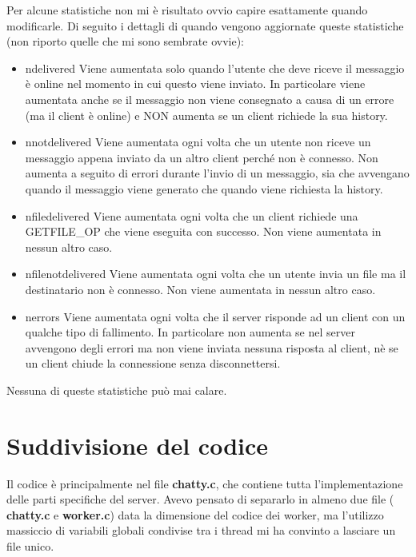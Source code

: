 \documentclass[a4paper]{article}
\theoremstyle{theorem}
\theoremstyle{remark}
\theoremstyle{definition}
\theoremstyle{corollary}
\theoremstyle{lemma}
\newcommand\file[1]{%
	\textbf{#1}}
\begin{document}
Per alcune statistiche non mi è risultato ovvio capire esattamente quando modificarle. Di seguito i dettagli di quando vengono aggiornate queste statistiche (non riporto quelle che mi sono sembrate ovvie):
\begin{itemize}
	\item{ndelivered} Viene aumentata solo quando l'utente che deve riceve il messaggio è online nel momento in cui questo viene inviato. In particolare viene aumentata anche se il messaggio non viene consegnato a causa di un errore (ma il client è online) e NON aumenta se un client richiede la sua history.
	\item{nnotdelivered} Viene aumentata ogni volta che un utente non riceve un messaggio appena inviato da un altro client perché non è connesso. Non aumenta a seguito di errori durante l'invio di un messaggio, sia che avvengano quando il messaggio viene generato che quando viene richiesta la history.
	\item{nfiledelivered} Viene aumentata ogni volta che un client richiede una GETFILE\_OP che viene eseguita con successo. Non viene aumentata in nessun altro caso.
	\item{nfilenotdelivered} Viene aumentata ogni volta che un utente invia un file ma il destinatario non è connesso. Non viene aumentata in nessun altro caso.
	\item{nerrors} Viene aumentata ogni volta che il server risponde ad un client con un qualche tipo di fallimento. In particolare non aumenta se nel server avvengono degli errori ma non viene inviata nessuna risposta al client, nè se un client chiude la connessione senza disconnettersi.
\end{itemize}
Nessuna di queste statistiche può mai calare.


\section{Suddivisione del codice}
Il codice è principalmente nel file \file{chatty.c}, che contiene tutta l'implementazione delle parti specifiche del server. Avevo pensato di separarlo in almeno due file (\file{chatty.c} e \file{worker.c}) data la dimensione del codice dei worker, ma l'utilizzo massiccio di variabili globali condivise tra i thread mi ha convinto a lasciare un file unico.
\end{document}
